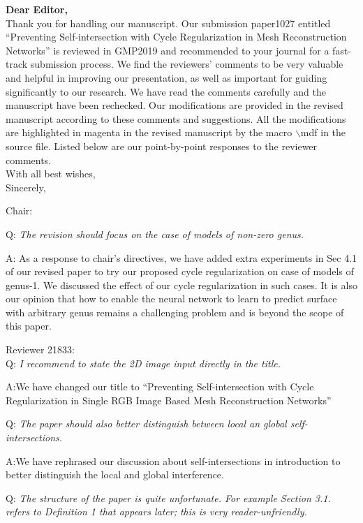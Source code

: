 \documentclass[10pt]{letter} %
\newcommand{\mdf}[1]{\textcolor[rgb]{1.00,0.00,1.00}{#1}}
\begin{document}
	\textbf{Dear Editor,}\\
	Thank you for handling our manuscript. Our submission paper1027 entitled ``Preventing Self-intersection with Cycle Regularization in Mesh
	Reconstruction Networks'' is reviewed in GMP2019 and recommended to your journal for a fast-track submission process. We find the reviewers’ comments to be very valuable and helpful in improving our presentation, as well as important for guiding significantly to our research. We have read the comments carefully and the manuscript have been rechecked. Our modifications are provided in the revised manuscript according to these comments and suggestions. All the modifications are \mdf{highlighted in magenta} in the revised manuscript by the macro $\backslash$mdf in the source file. Listed below are our point-by-point responses to the reviewer comments.\\
	With all best wishes,\\
	Sincerely,
	
	\hdashrule{\linewidth}{1pt}{1mm}
	Chair:
	
	Q: \emph{The revision should focus on the case of models of non-zero genus.}
	
	A: As a response to chair's directives, we have added extra experiments in Sec 4.1 of our revised paper to try our proposed cycle regularization on case of models of genus-1. We discussed the effect of our cycle regularization in such cases. It is also our opinion that how to enable the neural network to learn to predict surface with arbitrary genus remains a challenging problem and is beyond the scope of this paper. 
	
	\hdashrule{\linewidth}{1pt}{1mm}
	Reviewer 21833:\\
	Q: \emph{I recommend to state the 2D image input directly in the title.}
	
	A:We have changed our title to ``Preventing Self-intersection with Cycle Regularization in Single RGB Image Based Mesh Reconstruction Networks''
	
	Q: \emph{The paper should also better distinguish between local an global self-intersections.}
	
	A:We have rephrased our discussion about self-intersections in introduction to better distinguish the local and global interference.
	
	Q: \emph{The structure of the paper is quite unfortunate. For example Section 3.1. refers to Definition 1 that appears later; this is very reader-unfriendly.}
	
\end{document}
